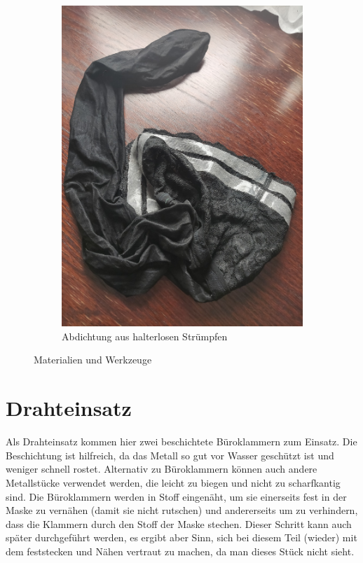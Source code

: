\documentclass[12pt,parskip=full]{scrartcl}
\begin{document}
\begin{figure}[h]
\begin{subfigure}{0.48\textwidth}
        \includegraphics[width = \linewidth]{Pictures/01_Materials/materials_02_resized.jpg}
        \caption{Abdichtung aus halterlosen Strümpfen}
    \end{subfigure}
    \caption{Materialien und Werkzeuge}
\end{figure}

\section{Drahteinsatz}
Als Drahteinsatz kommen hier zwei beschichtete Büroklammern zum Einsatz. Die Beschichtung ist hilfreich, da das Metall so gut vor Wasser geschützt ist und weniger schnell rostet. Alternativ zu Büroklammern können auch andere Metallstücke verwendet werden, die leicht zu biegen und nicht zu scharfkantig sind. Die Büroklammern werden in Stoff eingenäht, um sie einerseits fest in der Maske zu vernähen (damit sie nicht rutschen) und andererseits um zu verhindern, dass die Klammern durch den Stoff der Maske stechen. Dieser Schritt kann auch später durchgeführt werden, es ergibt aber Sinn, sich bei diesem Teil (wieder) mit dem feststecken und Nähen vertraut zu machen, da man dieses Stück nicht sieht.\par
\end{document}
